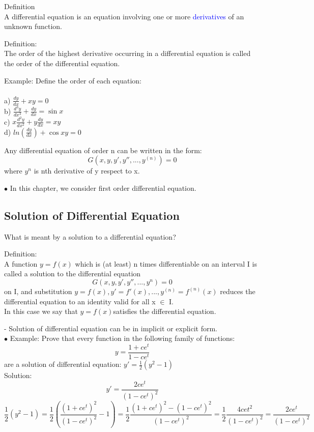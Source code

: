 \documentclass[12pt]{article}
\begin{document}
\begin{mybox}
    Definition\\ A differential equation is an equation involving one or more
\textcolor{blue}{derivatives} of an unknown function.
\end{mybox}
\begin{mybox}
    Definition:\\ The order of the highest derivative occurring in a differential equation
is called the order of the differential equation. 
\end{mybox}
Example: Define the order of each equation: \\
\\
a) $\frac{dy}{dx} +xy = 0$ 
\\
b) $\frac{d^3 y}{dx^3} + \frac{dy}{dx} = \sin x$
\\
c) $x\frac{d^2 y}{dx^2} + y\frac{dy}{dx} = xy$
\\
d) $ln(\frac{dy}{dx}) + \cos xy = 0$
\newpage
\begin{mybox}
    Any differential equation of order n can be written in the form: 
    $$G(x,y, y',y'',...,y^{(n)}) = 0$$
    where $y^n$ is nth derivative of y respect to x.
\end{mybox}
$\bullet$ In this chapter, we consider first order differential equation.

\subsection{Solution of Differential Equation} 
What is meant by a solution to a differential equation?
\begin{mybox}
    Definition:\\ A function $ y = f(x)$ which is (at least) n times differentiable on an interval I is called a solution to the differential equation
     $$G(x,y, y',y'',...,y^n) = 0$$
     on I, and substitution $y = f(x),y' = f'(x),..., y^{(n)}= f^{(n)}(x)$  reduces
the differential equation to an identity valid for all x $\in$ I. \\
In this case we say that $y = f(x)$satisfies the differential equation.
\end{mybox}
- Solution of differential equation can be in implicit or explicit form. 
\\ 
$\bullet$ Example: Prove that every function in the following family of functions: 
$$y = \frac{1+ ce^t}{1- ce^t}$$
are a solution of differential equation: $y' = \frac{1}{2}(y^2-1)$ \\
Solution: \\
$$y' = \frac{2ce^t}{(1-ce^t)^2}$$
$$\frac{1}{2}(y^2 -1) = \frac{1}{2} (\frac{(1+ce^t)^2}{(1-ce^t)^2} - 1) =\frac{1}{2} \frac{(1+ce^t)^2 - (1-ce^t)^2 }{(1-ce^t)^2} = \frac{1}{2} \frac{4cet^2}{(1-ce^t)^2} = \frac{2ce^t}{(1-ce^t)^2}$$
\end{document}
